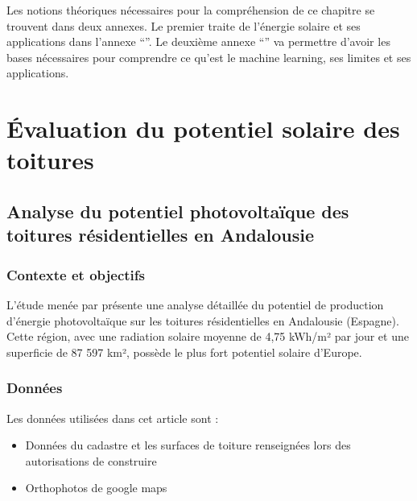 \par{Les notions théoriques nécessaires pour la compréhension de ce chapitre se trouvent dans deux annexes. Le premier traite de  l'énergie solaire et ses applications dans l'annexe ``''. Le deuxième annexe ``'' va permettre d’avoir les bases nécessaires pour comprendre ce qu’est le machine learning, ses
limites et ses applications.}

\section{Évaluation du potentiel solaire des toitures}

\subsection{Analyse du potentiel photovoltaïque des toitures résidentielles en Andalousie}

\subsubsection{Contexte et objectifs}
\par{L'étude menée par \citeauthor{ordonez_analysis_2010} \cite{ordonez_analysis_2010} présente une analyse détaillée du potentiel de production d'énergie photovoltaïque sur les toitures résidentielles en Andalousie (Espagne). Cette région, avec une radiation solaire moyenne de 4,75 kWh/m² par jour et une superficie de 87 597 km², possède le plus fort potentiel solaire d'Europe.}

\subsubsection{Données}
\par{Les données utilisées dans cet article sont :}
\begin{itemize}
    \item Données du cadastre et les surfaces de toiture renseignées lors des autorisations de construire
    \item Orthophotos de google maps
\end{itemize}

